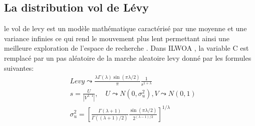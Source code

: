 \documentclass[12pt]{article}
\begin{document}
\subsection{La distribution vol de Lévy}
le vol de levy est un modèle mathématique caractérisé par une moyenne et une variance infinies ce qui rend le mouvement plus lent permettant ainsi une meilleure exploration de l'espace de recherche \cite{JAMIL201349}.
Dans ILWOA , la variable C est remplacé par un pas aléatoire de la marche aleatoire levy donné par les formules suivantes:
\begin{align*}
&Levy\leadsto\frac{\lambda\Gamma(\lambda)\sin(\pi\lambda/2)}{\pi}\frac{1}{s^{1+\lambda}}\\
&s=\frac{U}{\left|{V^{\lambda^-1}}\right| },\quad U\leadsto N(0,\sigma_u^2),V\leadsto N(0,1)\\
&\sigma_u^2=[\frac{\Gamma(\lambda+1)}{\Gamma((\lambda+1)/2)}\frac{\sin(\pi\lambda/2)}{2^{(\lambda-1)/2}}]^{1/\lambda}
\end{align*}
\end{document}
